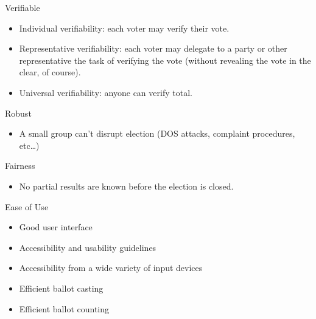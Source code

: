 \documentclass[utf8]{beamer}
\begin{document}
\begin{frame}{Verifiable}

\begin{itemize}
\item Individual verifiability: each voter may verify their vote.
\item Representative verifiability: each voter may delegate to a party
  or other representative the task of verifying the vote (without
  revealing the vote in the clear, of course).
\item Universal verifiability: anyone can verify total.
\end{itemize}

\end{frame}

\begin{frame}{Robust}

\begin{itemize}
\item A small group can't disrupt election (DOS attacks, complaint
  procedures, etc\ldots)
\end{itemize}

\end{frame}

\begin{frame}{Fairness}

\begin{itemize}
  \item No partial results are known before the election is closed.
  \end{itemize}
  
\end{frame}

\begin{frame}{Ease of Use}

\begin{itemize}
  \item Good user interface
  \item Accessibility and usability guidelines
  \item Accessibility from a wide variety of input devices
\end{itemize}

\end{frame}

\begin{frame}[Efficiency]

\begin{itemize}
  \item Efficient ballot casting
  \item Efficient ballot counting
  \end{itemize}
  
\end{frame}
\end{document}

